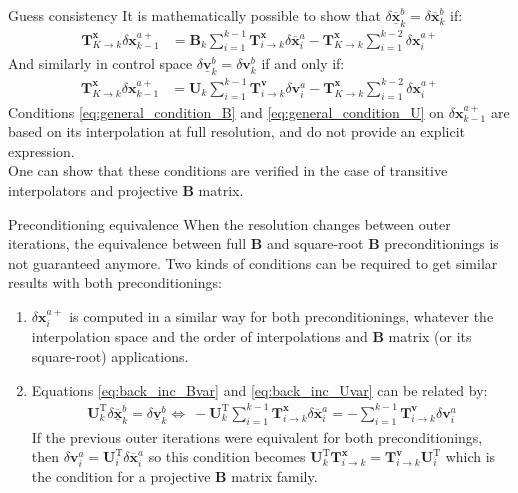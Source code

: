 \documentclass[8pt]{beamer}
\begin{document}
\begin{frame}{Guess consistency}
It is mathematically possible to show that $\delta \underline{\overline{\mathbf{x}}}^b_k = \delta \overline{\mathbf{x}}^b_k$ if:
\begin{align}
\label{eq:general_condition_B}
\mathbf{T}^\mathbf{x}_{K \rightarrow k} \delta \mathbf{x}^{a+}_{k-1} & =  \mathbf{B}_k \sum_{i=1}^{k-1} \mathbf{T}^\mathbf{x}_{i \rightarrow k} \delta \overline{\mathbf{x}}^a_i - \mathbf{T}^\mathbf{x}_{K \rightarrow k} \sum_{i=1}^{k-2} \delta \mathbf{x}^{a+}_i
\end{align}
And similarly in control space $\delta \underline{\mathbf{v}}^b_k = \delta \mathbf{v}^b_k$ if and only if:
\begin{align}
\label{eq:general_condition_U}
\mathbf{T}^\mathbf{x}_{K \rightarrow k} \delta \mathbf{x}^{a+}_{k-1} & = \mathbf{U}_k \sum_{i=1}^{k-1} \mathbf{T}^\mathbf{v}_{i \rightarrow k} \delta \mathbf{v}^a_i - \mathbf{T}^\mathbf{x}_{K \rightarrow k} \sum_{i=1}^{k-2} \delta \mathbf{x}^{a+}_i
\end{align}
Conditions \eqref{eq:general_condition_B} and \eqref{eq:general_condition_U} on $\delta \mathbf{x}^{a+}_{k-1}$ are based on its interpolation at full resolution, and do not provide an explicit expression.\\
\vspace{+0.3cm}
One can show that these conditions are verified in the case of transitive interpolators and projective $\mathbf{B}$ matrix.
\end{frame}

\begin{frame}{Preconditioning equivalence}
When the resolution changes between outer iterations, the equivalence between full $\mathbf{B}$ and square-root $\mathbf{B}$ preconditionings is not guaranteed anymore. Two kinds of conditions can be required to get similar results with both preconditionings:
\begin{enumerate}
\item $\delta \mathbf{x}^{a+}_i$ is computed in a similar way for both preconditionings, whatever the interpolation space and the order of interpolations and $\mathbf{B}$ matrix (or its square-root) applications.
\item Equations \eqref{eq:back_inc_Bvar} and \eqref{eq:back_inc_Uvar} can be related by:
\begin{align}\mathbf{U}^\mathrm{T}_k \delta \underline{\overline{\mathbf{x}}}^b_k = \delta \underline{\mathbf{v}}^b_k \Leftrightarrow \ - \mathbf{U}^\mathrm{T}_k  \sum_{i=1}^{k-1} \mathbf{T}^\mathbf{x}_{i \rightarrow k} \delta \overline{\mathbf{x}}^a_i = - \sum_{i=1}^{k-1} \mathbf{T}^\mathbf{v}_{i \rightarrow k} \delta \mathbf{v}^a_i
\end{align}
If the previous outer iterations were equivalent for both preconditionings, then $\delta \mathbf{v}^a_i = \mathbf{U}^\mathrm{T}_i \delta \overline{\mathbf{x}}^a_i$ so this condition becomes $\mathbf{U}^\mathrm{T}_k \mathbf{T}^\mathbf{x}_{i \rightarrow k} = \mathbf{T}^\mathbf{v}_{i \rightarrow k} \mathbf{U}^\mathrm{T}_i$ which is the condition for a projective $\mathbf{B}$ matrix family.
\end{enumerate}
\end{frame}
\end{document}
